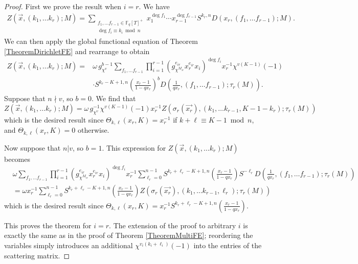 \documentclass[11pt,letterpaper]{article}
\theoremstyle{definition}
\theoremstyle{remark}
\numberwithin{equation}{section}
\theoremstyle{dotless}
\newcommand{\F}{\mathbb{F}}
\begin{document}
\begin{proof}
First we prove the result when $i=r$. We have
\begin{equation*}
\begin{split}
Z(\vec{x}, (k_1, \ldots k_r); M) =\sum_{\substack{f_1, \ldots f_{r-1} \in \F_q[T]^+ \\ \deg f_i \equiv k_i \bmod n}} x_1^{\deg f_1}\cdots x_{r-1}^{\deg f_{r-1}} S^{k_r, n} D(x_r, (f_1, \ldots f_{r-1}); M) .
\end{split}
\end{equation*}
We can then apply the global functional equation of Theorem \ref{TheoremDirichletFE} and rearrange to obtain
\begin{equation*}
\begin{split}
Z(\vec{x}, (k_1, \ldots k_r); M) =& \omega \, g_{\chi^v}^{b-1} \sum_{f_1, \ldots f_{r-1}} \prod_{i=1}^{r-1} (g_{\chi^{M_{ir}}}^{e_{ir}} x_r^{e_{ir}}x_i)^{\deg f_i} x_r^{-1} \chi^{v(K-1)}(-1) \\
&\cdot S^{k_r-K+1, n}  \left( \frac{x_r-1}{1- q x_r}\right)^b D \left(\frac{1}{q x_r}, (f_1, \ldots f_{r-1}); \tau_r(M) \right)  .
\end{split}
\end{equation*}
Suppose that $n \nmid v$, so $b=0$. We find that  
\begin{equation*}
Z(\vec{x}, (k_1, \ldots k_r); M)=\omega \, g_{\chi^v}^{-1} \chi^{v(K-1)}(-1) x_r^{-1} Z(\sigma_r(\vec{x_r}), (k_1, \ldots k_{r-1}, K-1-k_r); \tau_r(M)) 
\end{equation*}
which is the desired result since $\Theta_{k, \ell}(x_r, K)= x_r^{-1}$ if $k+\ell \equiv K-1 \bmod n$, and $\Theta_{k, \ell}(x_r, K)=0$ otherwise.

Now suppose that $n|v$, so $b=1$. This expression for $Z(\vec{x}, (k_1, \ldots k_r); M)$ becomes
\begin{equation*}
\begin{split}
&\omega \sum_{f_1, \ldots f_{r-1}} \prod_{i=1}^{r-1} (g_{\chi^{M_{ir}}}^{e_{ir}} x_r^{e_{ir}}x_i)^{\deg f_i} x_r^{-1} \sum_{\ell_r=0}^{n-1} S^{k_r+\ell_r -K+1, n}  \left( \frac{x_r-1}{1- q x_r}\right) S^{-\ell_r} D \left(\frac{1}{q x_r}, (f_1, \ldots f_{r-1}); \tau_r(M) \right) \\
&=\omega x_r^{-1} \sum_{\ell_r=0}^{n-1} S^{k_r+\ell_r -K+1, n}  \left( \frac{x_r-1}{1- q x_r}\right) Z(\sigma_r(\vec{x_r}), (k_1, \ldots k_{r-1}, \ell_r); \tau_r(M)) 
\end{split}
\end{equation*}
which is the desired result since $\Theta_{k, \ell}(x_r, K)= x_r^{-1} S^{k_r+\ell_r -K+1, n}  \left( \frac{x_r-1}{1- q x_r}\right)$.

This proves the theorem for $i=r$. The extension of the proof to arbitrary $i$ is exactly the same as in the proof of Theorem \ref{TheoremMultiFE}; reordering the variables simply introduces an additional $\chi^{v_i(k_i+\ell_i)}(-1)$ into the entries of the scattering matrix.
\end{proof}
\end{document}
